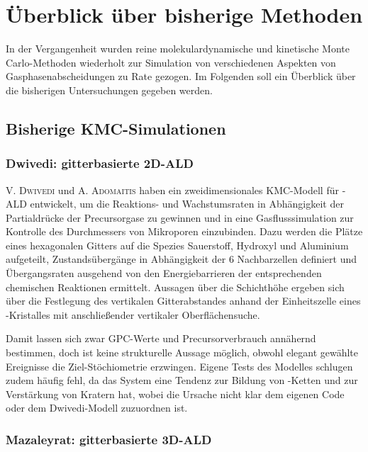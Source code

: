 \section{Überblick über bisherige Methoden}

In der Vergangenheit wurden reine molekulardynamische und kinetische Monte Carlo-Methoden wiederholt zur Simulation von verschiedenen Aspekten von Gasphasenabscheidungen zu Rate gezogen.
Im Folgenden soll ein Überblick über die bisherigen Untersuchungen gegeben werden.

\subsection{Bisherige KMC-Simulationen}

\subsubsection{Dwivedi: gitterbasierte 2D-ALD}

\textsc{V. Dwivedi} und \textsc{A. Adomaitis} haben ein zweidimensionales KMC-Modell für -ALD entwickelt\cite{dwivedi_multiscale_2009, dwivedi_multiscale_2009-1, dwivedi_multiscale_2010}, um die Reaktions- und Wachstumsraten in Abhängigkeit der Partialdrücke der Precursorgase zu gewinnen und in eine Gasflusssimulation zur Kontrolle des Durchmessers von Mikroporen einzubinden.
Dazu werden die Plätze eines hexagonalen Gitters auf die Spezies Sauerstoff, Hydroxyl und Aluminium aufgeteilt, Zustandsübergänge in Abhängigkeit der 6 Nachbarzellen definiert und Übergangsraten ausgehend von den Energiebarrieren der entsprechenden chemischen Reaktionen ermittelt.
Aussagen über die Schichthöhe ergeben sich über die Festlegung des vertikalen Gitterabstandes anhand der Einheitszelle eines -Kristalles mit anschließender vertikaler Oberflächensuche.

Damit lassen sich zwar GPC-Werte und Precursorverbrauch annähernd bestimmen, doch ist keine strukturelle Aussage möglich, obwohl elegant gewählte Ereignisse die Ziel-Stöchiometrie erzwingen.
Eigene Tests des Modelles schlugen zudem häufig fehl, da das System eine Tendenz zur Bildung von -Ketten und zur Verstärkung von Kratern hat, wobei die Ursache nicht klar dem eigenen Code oder dem Dwivedi-Modell zuzuordnen ist.

\subsubsection{Mazaleyrat: gitterbasierte 3D-ALD}

